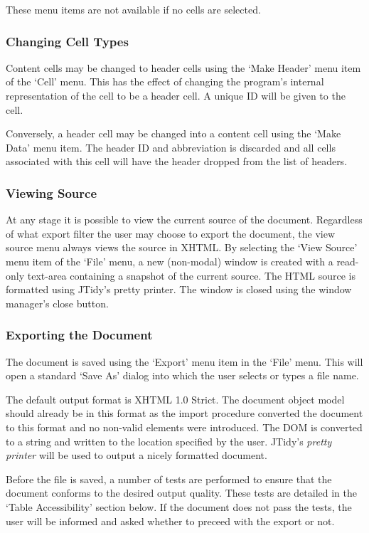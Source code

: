 These menu items are not available if no cells are selected.

\subsubsection{Changing Cell Types}

Content cells may be changed to header cells using the `Make Header' menu item
of the `Cell' menu. This has the effect of changing the program's internal
representation of the cell to be a header cell. A unique ID will be given to
the cell.

Conversely, a header cell may be changed into a content cell using the `Make
Data' menu item. The header ID and abbreviation is discarded and all cells
associated with this cell will have the header dropped from the list of
headers.

\subsubsection{Viewing Source}

At any stage it is possible to view the current source of the document.
Regardless of what export filter the user may choose to export the document,
the view source menu always views the source in XHTML. By selecting the `View
Source' menu item of the `File' menu, a new (non-modal) window is created with
a read-only text-area containing a snapshot of the current source. The HTML
source is formatted using JTidy's pretty printer. The window is closed using
the window manager's close button. 

\subsubsection{Exporting the Document}

The document is saved using the `Export' menu item in the `File' menu. This
will open a standard `Save As' dialog into which the user selects or types a
file name.

The default output format is XHTML 1.0 Strict. The document object model should
already be in this format as the import procedure converted the document to
this format and no non-valid elements were introduced. The DOM is
converted to a string and written to the location specified by the user. 
JTidy's \emph{pretty printer} will be used to output a nicely formatted document.

Before the file is saved, a number of tests are performed to ensure that the
document conforms to the desired output quality. These tests are detailed in
the `Table Accessibility' section below. If the document does not pass the
tests, the user will be informed and asked whether to preceed with the export
or not.

